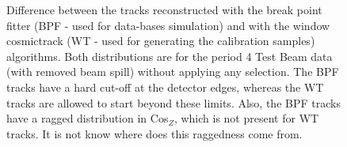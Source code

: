 \documentclass[12pt]{article}
\begin{document}
\begin{figure}[!ht]
\centering
{}
\vspace*{-6mm}
\caption{Difference between the tracks reconstructed with the break point fitter (BPF - used for data-bases simulation) and with the window cosmictrack (WT - used for generating the calibration samples) algorithms. Both distributions are for the period 4 Test Beam data (with removed beam spill) without applying any selection. The BPF tracks have a hard cut-off at the detector edges, whereas the WT tracks are allowed to start beyond these limits. Also, the BPF tracks have a ragged distribution in Cos$_Z$, which is not present for WT tracks. It is not know where does this raggedness come from.}
\label{figTrackComparison}
\end{figure}
\end{document}
